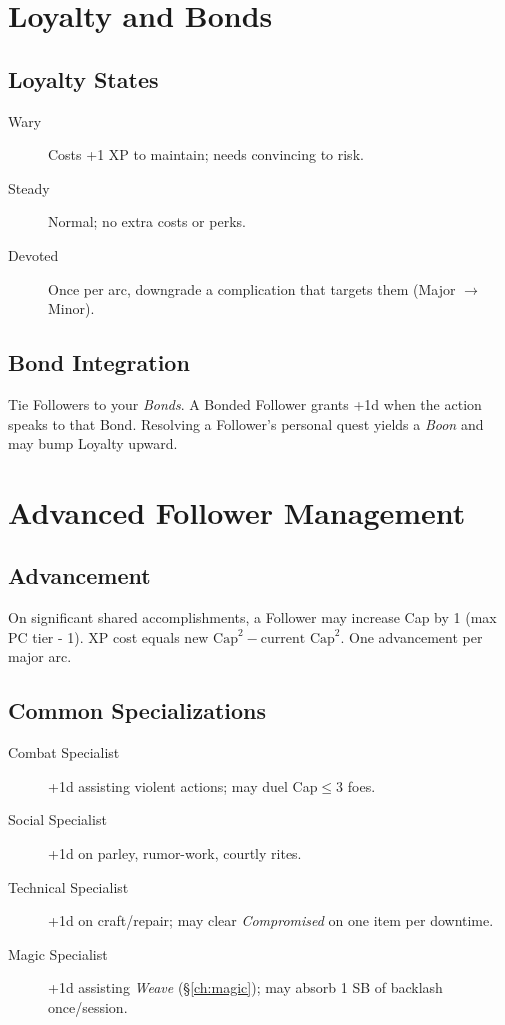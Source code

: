 \section{Loyalty and Bonds}

\subsection*{Loyalty States}
\begin{description}
  \item[Wary] Costs +1 XP to maintain; needs convincing to risk.
  \item[Steady] Normal; no extra costs or perks.
  \item[Devoted] Once per arc, downgrade a complication that targets them (Major \(\rightarrow\) Minor). 
\end{description}

\subsection*{Bond Integration}
Tie Followers to your \emph{Bonds}. A Bonded Follower grants +1d when the action speaks to that Bond. Resolving a Follower's personal quest yields a \emph{Boon} and may bump Loyalty upward.

\section{Advanced Follower Management}

\subsection*{Advancement}
On significant shared accomplishments, a Follower may increase Cap by 1 (max PC tier - 1). XP cost equals \(\text{new Cap}^2 - \text{current Cap}^2\). One advancement per major arc.

\subsection*{Common Specializations}
\begin{description}
  \item[Combat Specialist] +1d assisting violent actions; may duel Cap\(\leq\)3 foes.
  \item[Social Specialist] +1d on parley, rumor-work, courtly rites.
  \item[Technical Specialist] +1d on craft/repair; may clear \emph{Compromised} on one item per downtime.
  \item[Magic Specialist] +1d assisting \emph{Weave} (\S\ref{ch:magic}); may absorb 1 SB of backlash once/session. 
\end{description}

